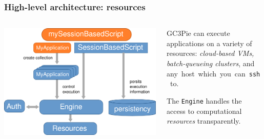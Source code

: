 \documentclass[english,serif,mathserif,xcolor=pdftex,dvipsnames,table]{beamer}
\begin{document}
\begin{frame}
  \frametitle{High-level architecture: resources}
  \begin{columns}
    \begin{column}{0.5\textwidth}
      \includegraphics[width=1\textwidth]{fig/GC3Pie_execution_model}
    \end{column}
    \begin{column}{0.6\textwidth}
      \begin{flushright}

        GC3Pie can execute applications on a variety of resources:
        \alert<2>{\em cloud-based VMs,} \\
        \alert<3>{\em batch-queueing clusters}, and \\
        \alert<4>{any~host~which~you~can~\texttt{ssh}~to.}

        \+ The \texttt{Engine} handles the access to computational {\em
          resources} transparently.
      \end{flushright}
    \end{column}
  \end{columns}
\end{frame}
\end{document}
